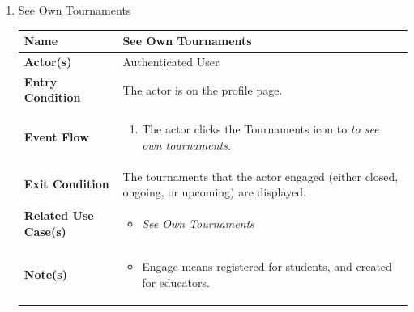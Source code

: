\begin{enumerate}
\item See Own Tournaments
\begin{center}
    \begin{tabular}{ | m{10em} | m{10cm}| } 
      \hline
      \textbf{Name} & See Own Tournaments  \\ 
      \hline
      \textbf{Actor(s)} & Authenticated User \\ 
      \hline
      \textbf{Entry Condition} & The actor is on the profile page. \\ 
      \hline
      \textbf{Event Flow} & 
          \begin{enumerate}[(1)]
              \item The actor clicks the Tournaments icon to \textit{to see own tournaments}.
          \end{enumerate}
      \\ 
      \hline
      \textbf{Exit Condition} & The tournaments that the actor engaged (either closed, ongoing, or upcoming) are displayed.  \\ 
      \hline
      \textbf{Related Use Case(s)} & 
      \begin{itemize}
          \item \textit{See Own Tournaments}
      \end{itemize}
          \\ 
      \hline
      \textbf{Note(s)} & 
      \begin{itemize}
          \item Engage means registered for students, and created for educators.
      \end{itemize}
          \\ 
      \hline
    \end{tabular}
     \label{tbl:uc16}
\end{center}


\end{enumerate}
